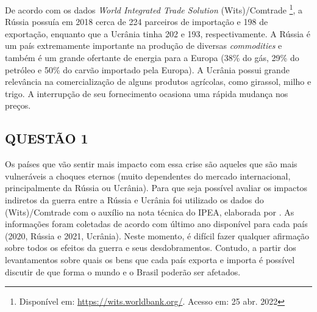 \documentclass[
article, %
12pt, %
oneside, %
a4paper, %
portuguese, %
portuguese %
]{abntex2}
\begin{document}
De acordo com os dados \textit{World Integrated Trade Solution} (Wits)/Comtrade \footnote{Disponível em: \href{https://wits.worldbank.org/}{https://wits.worldbank.org/}. Acesso em: 25 abr. 2022}, a Rússia possuía em 2018 cerca de 224 parceiros de importação e 198 de exportação, enquanto que a Ucrânia tinha 202 e 193, respectivamente. A Rússia é um país extremamente importante na produção de diversas \textit{commodities} e também é um grande ofertante de energia para a Europa (38\% do gás, 29\% do petróleo e 50\% do carvão importado pela Europa). A Ucrânia possui grande relevância na comercialização de alguns produtos agrícolas, como girassol, milho e trigo. A interrupção de seu fornecimento ocasiona uma rápida mudança nos preços.


\subsection{QUESTÃO 1}

Os países que vão sentir mais impacto com essa crise são aqueles que são mais vulneráveis a choques eternos (muito dependentes do mercado internacional, principalmente da Rússia ou Ucrânia). Para que seja possível avaliar os impactos indiretos da guerra entre a Rússia e Ucrânia foi utilizado os dados do (Wits)/Comtrade com o auxílio na nota técnica do IPEA, elaborada por . As informações foram coletadas de acordo com último ano disponível para cada país (2020, Rússia e 2021, Ucrânia). Neste momento, é difícil fazer qualquer afirmação sobre todos os efeitos da guerra e seus desdobramentos. Contudo, a partir dos levantamentos sobre quais os bens que cada país exporta e importa é possível discutir de que forma o mundo e o Brasil poderão ser afetados.


\end{document}
